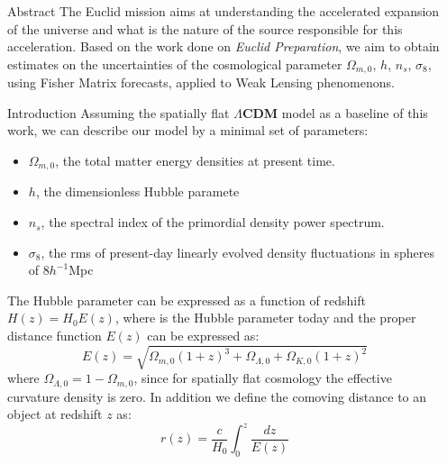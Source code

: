 






\begin{frame}[t] %

\begin{columns}[t] %

\begin{column}{.02\textwidth}\end{column} %

\begin{column}{.465\textwidth} %

\begin{block}{Abstract}
The Euclid mission aims at understanding the accelerated expansion of the universe and what is the nature of the source responsible for this acceleration. Based on the work done on \textit{Euclid Preparation}, we aim to obtain estimates on the uncertainties of the cosmological parameter $\Omega_{m,0}$, $h$, $n_s$, $\sigma_8$, using Fisher Matrix forecasts, applied to Weak Lensing phenomenons.

\end{block}

\begin{block}{Introduction}
	Assuming the spatially flat $\Lambda$\textbf{CDM} model as a baseline of this work, we can describe our model by a minimal set of parameters:
\begin{itemize}
    \item $\Omega_{m,0}$, the total matter energy densities at present time.
    \item $h$, the dimensionless Hubble paramete
    \item $n_s$, the spectral index of the primordial density power spectrum.
    \item $\sigma_8$, the rms of present-day linearly evolved density fluctuations in spheres of $8h^{-1}$Mpc 
\end{itemize}
The Hubble parameter can be expressed as a function of redshift $H(z) = H_0 E(z)$, where is the Hubble parameter today and the proper distance function $E(z)$ can be expressed as:
$$ E(z) = \sqrt{\Omega_{m,0}(1+z)^3 +\Omega_{\Lambda,0}+ \Omega_{K,0}(1+z)^2}$$
where $\Omega_{\Lambda,0}=1-\Omega_{m,0}$, since for spatially flat cosmology the effective curvature density is zero. In addition we define the comoving distance to an object at redshift $z$ as:
$$r(z) = \frac{c}{H_0}\int_{0}^{z} \frac{dz}{E(z)}$$


\end{block}
\end{column}
\end{columns}
\end{frame}
